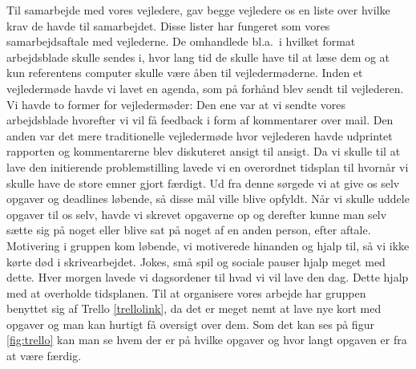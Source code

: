 \documentclass[oneside,a4paper,titlepage]{article}
\begin{document}
Til samarbejde med vores vejledere, gav begge vejledere os en liste over hvilke krav de havde til samarbejdet. Disse lister har fungeret som vores samarbejdsaftale med vejlederne. De omhandlede bl.a.\ i hvilket format arbejdsblade skulle sendes i, hvor lang tid de skulle have til at læse dem og at kun referentens computer skulle være åben til vejledermøderne. Inden et vejledermøde havde vi lavet en agenda, som på forhånd blev sendt til vejlederen. Vi havde to former for vejledermøder: Den ene var at vi sendte vores arbejdsblade hvorefter vi vil få feedback i form af kommentarer over mail. Den anden var det mere traditionelle vejledermøde hvor vejlederen havde udprintet rapporten og kommentarerne blev diskuteret ansigt til ansigt. \newline\newline
Da vi skulle til at lave den initierende problemstilling lavede vi en overordnet tidsplan til hvornår vi skulle have de store emner gjort færdigt. Ud fra denne sørgede vi at give os selv opgaver og deadlines løbende, så disse mål ville blive opfyldt. \newline
Når vi skulle uddele opgaver til os selv, havde vi skrevet opgaverne op og derefter kunne man selv sætte sig på noget eller blive sat på noget af en anden person, efter aftale. Motivering i gruppen kom løbende, vi motiverede hinanden og hjalp til, så vi ikke kørte død i skrivearbejdet. Jokes, små spil og sociale pauser hjalp meget med dette. 
Hver morgen lavede vi dagsordener til hvad vi vil lave den dag. Dette hjalp med at overholde tidsplanen. Til at organisere vores arbejde har gruppen benyttet sig af Trello \ref{trellolink}, da det er meget nemt at lave nye kort med opgaver og man kan hurtigt få oversigt over dem. Som det kan ses på figur \ref{fig:trello} kan man se hvem der er på hvilke opgaver og hvor langt opgaven er fra at være færdig.
\end{document}
